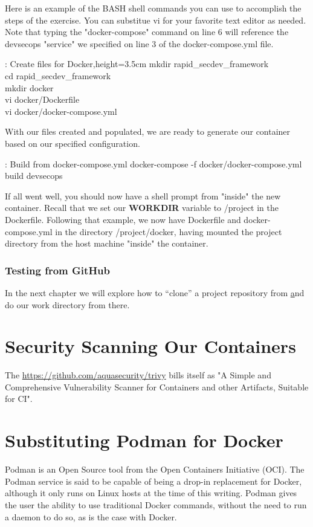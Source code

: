 \justify{}
Here is an example of the BASH shell commands you can use to accomplish
the steps of the exercise. You can substitue vi for your favorite text
editor as needed. Note that typing the "docker-compose" command on line
6 will reference the devsecops "service" we specified on line 3 of the
docker-compose.yml file.

\justify{}
\begin{mybox}{\thetcbcounter: Create files for Docker,height=3.5cm}
  mkdir rapid\_secdev\_framework\\
  cd rapid\_secdev\_framework\\
  mkdir docker\\
  vi docker/Dockerfile\\
  vi docker/docker-compose.yml
\end{mybox}

\justify{}
With our files created and populated, we are ready to generate our
container based on our specified configuration.

\begin{mybox}{\thetcbcounter: Build from docker-compose.yml }
  docker-compose -f docker/docker-compose.yml build devsecops
\end{mybox}

\justify{}
If all went well, you should now have a shell prompt from "inside" the
new container. Recall that we set our \textbf{WORKDIR} variable to /project in the Dockerfile. Following that example, we now have Dockerfile and docker-compose.yml in the directory /project/docker, having mounted the project directory from the host machine "inside" the container.

\subsubsection{Testing from GitHub}
\justify{}
In the next chapter
we will explore how to ``clone'' a project repository from 
\href{github.com} and
do our work directory from there.

\section{Security Scanning Our Containers}
The \href{trivy container scanner}{https://github.com/aquasecurity/trivy} bills itself as "A Simple and
Comprehensive Vulnerability Scanner for Containers and other
Artifacts, Suitable for CI".

\section{Substituting Podman for Docker}
\justify{}
Podman is an Open Source tool from the Open
Containers Initiative (OCI). The Podman service is said to be capable
of being a drop-in replacement for Docker, although it only
runs on Linux hosts at the time of this writing. Podman gives
the user the ability to use traditional Docker commands,
without the need to run a daemon to do so\cite{podman}, as is
the case with Docker.

